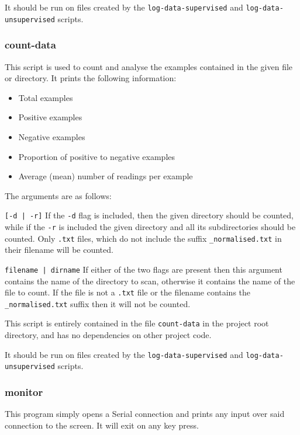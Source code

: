 \documentclass[a4paper]{article}
\begin{document}
It should be run on files created by the \lstinline{log-data-supervised} and \lstinline{log-data-unsupervised} scripts.

\subsubsection{count-data}
\label{subsubsec:dc_csa_countdata}

This script is used to count and analyse the examples contained in the given file or directory. It prints the following information:

\begin{itemize}
\item Total examples
\item Positive examples
\item Negative examples
\item Proportion of positive to negative examples
\item Average (mean) number of readings per example
\end{itemize}

The arguments are as follows:

\lstinline{[-d | -r]} If the \lstinline{-d} flag is included, then the given directory should be counted, while if the \lstinline{-r} is included the given directory and all its subdirectories should be counted. Only \lstinline{.txt} files, which do not include the suffix \lstinline{_normalised.txt} in their filename will be counted.

\lstinline{filename | dirname} If either of the two flags are present then this argument contains the name of the directory to scan, otherwise it contains the name of the file to count. If the file is not a \lstinline{.txt} file or the filename contains the \lstinline{_normalised.txt} suffix then it will not be counted.

This script is entirely contained in the file \lstinline{count-data} in the project root directory, and has no dependencies on other project code.

It should be run on files created by the \lstinline{log-data-supervised} and \lstinline{log-data-unsupervised} scripts.

\subsubsection{monitor}
\label{subsubsec:dc_csa_monitor}

This program simply opens a Serial connection and prints any input over said connection to the screen. It will exit on any key press.
\end{document}
